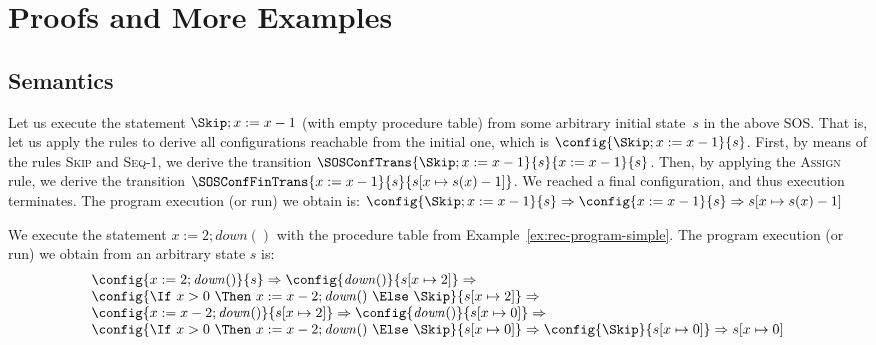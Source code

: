 \documentclass[a4paper,numberwithinsect]{lipics-v2021}
\begin{document}

\appendix

\section{Proofs and More Examples}

\subsection{Semantics}
\label{sec:semantics-app}

\begin{example}\label{ex:sos-simple}
  Let us execute the statement $\Skip ; x := x-1$ (with empty
  procedure table) from some arbitrary initial state~$s$ in the above
  SOS.
  That is, let us apply the rules to derive all configurations
  reachable from the initial one, which is
  $\config{\Skip ; x := x-1}{s}$.
  First, by means of the rules \textsc{Skip} and \textsc{Seq-1}, we
  derive the transition
  $\SOSConfTrans{\Skip ; x := x-1}{s}{x := x-1}{s}$.
  Then, by applying the \textsc{Assign} rule, we derive the transition
  $\SOSConfFinTrans{x := x-1}{s}{s [x \mapsto s(x)-1]}$.
  We reached a final configuration, and thus execution terminates.
  The program execution (or run) we obtain is:
  $
  \config{\Skip ; x := x-1}{s}  \Rightarrow
  \config{x := x-1}{s}          \Rightarrow
  s [x \mapsto s(x)-1]
  $
\end{example}

\begin{example}\label{ex:sos-rec}
  We execute the statement $x:=2;\mathit{down}()$ with the procedure
  table from Example~\ref{ex:rec-program-simple}.  The program
  execution (or run) we obtain from an arbitrary state $s$ is:
  $$
  \begin{array}{l}
  \config{x:=2;\mathit{down}()}{s}  \Rightarrow
  \config{\mathit{down}()}{s[x \mapsto 2]}  \Rightarrow \\
  \config{\If\ x > 0\ \Then\ x := x-2; \mathit{down}()\ \Else\ \Skip}{s[x \mapsto 2]}  \Rightarrow \\
  \config{x := x-2; \mathit{down}()}{s[x \mapsto 2]}  \Rightarrow 
  \config{\mathit{down}()}{s[x \mapsto 0]}  \Rightarrow \\
  \config{\If\ x > 0\ \Then\ x := x-2; \mathit{down}()\ \Else\ \Skip}{s[x \mapsto 0]}  \Rightarrow 
  \config{\Skip}{s[x \mapsto 0]}  \Rightarrow s[x \mapsto 0]
  \end{array}
  $$
\end{example}
\end{document}
